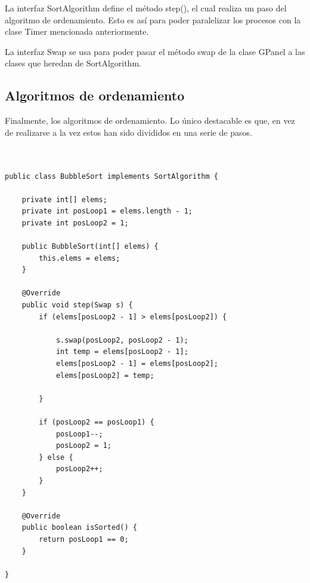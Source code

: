 \documentclass[paper=a4, fontsize=11pt]{scrartcl} %
\numberwithin{equation}{section} %
\numberwithin{figure}{section} %
\numberwithin{table}{section} %
\begin{document}
La interfaz SortAlgorithm define el método step(), el cual realiza un paso del algoritmo de ordenamiento.
Esto es así para poder paralelizar los procesos con la clase Timer mencionada anteriormente.

La interfaz Swap se usa para poder pasar el método swap de la clase GPanel a las clases que heredan de
SortAlgorithm.

\subsection{Algoritmos de ordenamiento}

Finalmente, los algoritmos de ordenamiento. Lo único destacable es que, en vez de realizarse a la vez
estos han sido divididos en una serie de pasos.

\begin{lstlisting}


public class BubbleSort implements SortAlgorithm {

    private int[] elems;
    private int posLoop1 = elems.length - 1;
    private int posLoop2 = 1;

    public BubbleSort(int[] elems) {
        this.elems = elems;
    }

    @Override
    public void step(Swap s) {
        if (elems[posLoop2 - 1] > elems[posLoop2]) {

            s.swap(posLoop2, posLoop2 - 1);
            int temp = elems[posLoop2 - 1];
            elems[posLoop2 - 1] = elems[posLoop2];
            elems[posLoop2] = temp;

        }

        if (posLoop2 == posLoop1) {
            posLoop1--;
            posLoop2 = 1;
        } else {
            posLoop2++;
        }
    }

    @Override
    public boolean isSorted() {
        return posLoop1 == 0;
    }

}


\end{lstlisting}
\end{document}
